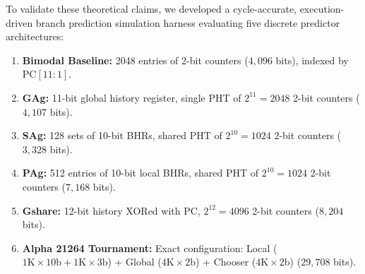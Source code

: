\documentclass[11pt,a4paper]{article}
\begin{document}
To validate these theoretical claims, we developed a cycle-accurate, execution-driven branch prediction simulation harness evaluating five discrete predictor architectures:
\begin{enumerate}[leftmargin=1.8em, itemsep=0.2em]
    \item \textbf{Bimodal Baseline:} 2048 entries of 2-bit counters ($4,096$ bits), indexed by $\text{PC}[11:1]$.
    \item \textbf{GAg:} 11-bit global history register, single PHT of $2^{11} = 2048$ 2-bit counters ($4,107$ bits).
    \item \textbf{SAg:} 128 sets of 10-bit BHRs, shared PHT of $2^{10} = 1024$ 2-bit counters ($3,328$ bits).
    \item \textbf{PAg:} 512 entries of 10-bit local BHRs, shared PHT of $2^{10} = 1024$ 2-bit counters ($7,168$ bits).
    \item \textbf{Gshare:} 12-bit history XORed with PC, $2^{12} = 4096$ 2-bit counters ($8,204$ bits).
    \item \textbf{Alpha 21264 Tournament:} Exact configuration: Local ($1\text{K}\times 10\text{b} + 1\text{K}\times 3\text{b}$) + Global ($4\text{K}\times 2\text{b}$) + Chooser ($4\text{K}\times 2\text{b}$) ($29,708$ bits).
\end{enumerate}
\end{document}
